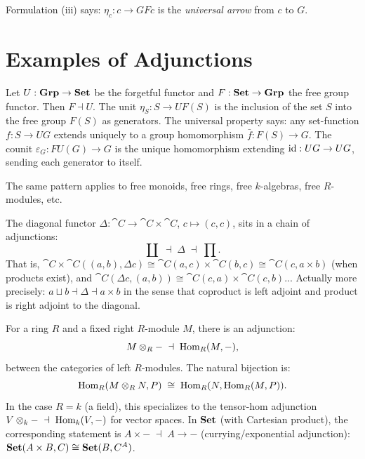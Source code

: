 Formulation (iii) says: $\eta_c: c \to GFc$ is the \emph{universal arrow} from $c$ to $G$.

\section{Examples of Adjunctions}

\begin{example}
Let $U: \mathbf{Grp} \to \mathbf{Set}$ be the forgetful functor and $F: \mathbf{Set} \to \mathbf{Grp}$ the free group functor. Then $F \dashv U$. The unit $\eta_S: S \to UF(S)$ is the inclusion of the set $S$ into the free group $F(S)$ as generators. The universal property says: any set-function $f: S \to UG$ extends uniquely to a group homomorphism $\bar{f}: F(S) \to G$. The counit $\varepsilon_G: FU(G) \to G$ is the unique homomorphism extending $\mathrm{id}: UG \to UG$, sending each generator to itself.

The same pattern applies to free monoids, free rings, free $k$-algebras, free $R$-modules, etc.
\end{example}

\begin{example}
The diagonal functor $\Delta: \cat{C} \to \cat{C} \times \cat{C}$, $c \mapsto (c,c)$, sits in a chain of adjunctions:
\[
  \coprod \;\dashv\; \Delta \;\dashv\; \prod.
\]
That is, $\cat{C} \times \cat{C}((a,b), \Delta c) \cong \cat{C}(a,c) \times \cat{C}(b,c) \cong \cat{C}(c, a \times b)$ (when products exist), and $\cat{C}(\Delta c, (a,b)) \cong \cat{C}(c,a) \times \cat{C}(c,b)$... Actually more precisely: $a \sqcup b \dashv \Delta \dashv a \times b$ in the sense that coproduct is left adjoint and product is right adjoint to the diagonal.
\end{example}

\begin{example}
For a ring $R$ and a fixed right $R$-module $M$, there is an adjunction:
\[
  M \otimes_R - \;\dashv\; \operatorname{Hom}_R(M,-),
\]
between the categories of left $R$-modules. The natural bijection is:
\[
  \operatorname{Hom}_R(M \otimes_R N, P) \;\cong\; \operatorname{Hom}_R(N, \operatorname{Hom}_R(M, P)).
\]
In the case $R = k$ (a field), this specializes to the tensor-hom adjunction $V \otimes_k - \;\dashv\; \operatorname{Hom}_k(V, -)$ for vector spaces. In $\mathbf{Set}$ (with Cartesian product), the corresponding statement is $A \times - \;\dashv\; A \to -$ (currying/exponential adjunction): $\mathbf{Set}(A \times B, C) \cong \mathbf{Set}(B, C^A)$.
\end{example}

